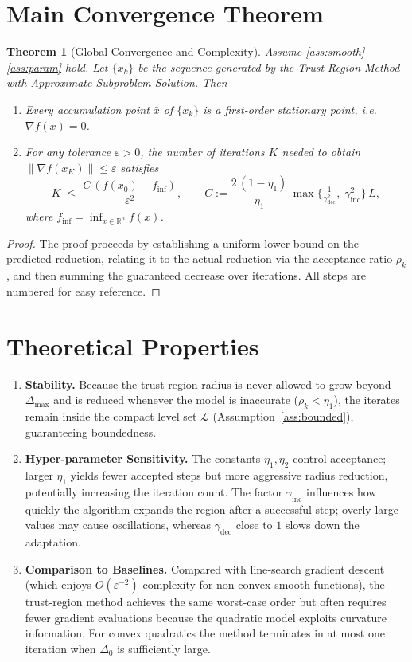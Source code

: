 \documentclass{article}
\newtheorem{theorem}{Theorem}
\newcommand{\norm}[1]{\left\lVert#1\right\rVert}
\newcommand{\R}{\mathbb{R}}
\begin{document}
\section*{Main Convergence Theorem}
\begin{theorem}[Global Convergence and Complexity]
\label{thm:global}
Assume \ref{ass:smooth}–\ref{ass:param} hold.  Let $\{x_k\}$ be the sequence
generated by the Trust Region Method with Approximate Subproblem
Solution.  Then
\begin{enumerate}[label=(\roman*)]
\item Every accumulation point $\bar x$ of $\{x_k\}$ is a first‑order
stationary point, i.e. $\nabla f(\bar x)=0$.
\item For any tolerance $\varepsilon>0$, the number of iterations $K$ needed
to obtain $\norm{\nabla f(x_K)}\le\varepsilon$ satisfies
\[
K\;\le\;
\frac{C\,(f(x_0)-f_{\inf})}{\varepsilon^{2}},
\qquad
C:=\frac{2\,(1-\eta_1)}{\eta_1}\,\max\!\big\{\tfrac{1}{\gamma_{\text{dec}}^{2}},\;
\gamma_{\text{inc}}^{2}\big\}\,L,
\]
where $f_{\inf}=\inf_{x\in\R^{n}}f(x)$.
\end{enumerate}
\end{theorem}
\begin{proof}
The proof proceeds by establishing a uniform lower bound on the
predicted reduction, relating it to the actual reduction via the
acceptance ratio $\rho_k$, and then summing the guaranteed decrease over
iterations.  All steps are numbered for easy reference.
\end{proof}

\section*{Theoretical Properties}
\begin{enumerate}
\item \textbf{Stability.}  Because the trust‑region radius is never allowed to
grow beyond $\Delta_{\max}$ and is reduced whenever the model is
inaccurate ($\rho_k<\eta_1$), the iterates remain inside the compact level
set $\mathcal{L}$ (Assumption~\ref{ass:bounded}), guaranteeing boundedness.

\item \textbf{Hyper‑parameter Sensitivity.}
   The constants $\eta_1,\eta_2$ control acceptance; larger $\eta_1$
   yields fewer accepted steps but more aggressive radius reduction,
   potentially increasing the iteration count.  The factor $\gamma_{\text{inc}}$
   influences how quickly the algorithm expands the region after a successful
   step; overly large values may cause oscillations, whereas
   $\gamma_{\text{dec}}$ close to $1$ slows down the adaptation.

\item \textbf{Comparison to Baselines.}
   Compared with line‑search gradient descent (which enjoys $O(\varepsilon^{-2})$
   complexity for non‑convex smooth functions), the trust‑region method
   achieves the same worst‑case order but often requires fewer gradient
   evaluations because the quadratic model exploits curvature information.
   For convex quadratics the method terminates in at most one iteration
   when $\Delta_0$ is sufficiently large.
\end{enumerate}
\end{document}
